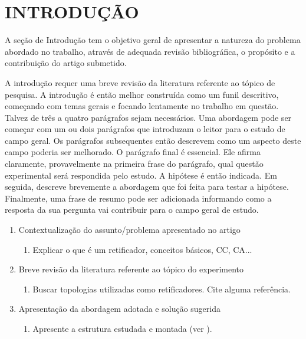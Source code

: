 %


\section{INTRODUÇÃO}


A seção de Introdução tem o objetivo geral de apresentar a natureza do problema abordado no trabalho, através de adequada revisão bibliográfica, o propósito e a contribuição do artigo submetido.

A introdução requer uma breve revisão da literatura referente ao tópico de pesquisa. A introdução é então melhor construída como um funil descritivo, começando com temas gerais e focando lentamente no trabalho em questão. Talvez de três a quatro parágrafos sejam necessários. Uma abordagem pode ser começar com um ou dois parágrafos que introduzam o leitor para o estudo de campo geral. Os parágrafos subsequentes então descrevem como um aspecto deste campo poderia ser melhorado. O parágrafo final é essencial. Ele afirma claramente, provavelmente na primeira frase do parágrafo, qual questão experimental será respondida pelo estudo. A hipótese é então indicada. Em seguida, descreve brevemente a abordagem que foi feita para testar a hipótese. Finalmente, uma frase de resumo pode ser adicionada informando como a resposta da sua pergunta vai contribuir para o campo geral de estudo.

\begin{enumerate}
\item Contextualização do assunto/problema apresentado no artigo
	\begin{enumerate}
		\item Explicar o que é um retificador, conceitos básicos, CC, CA...
	\end{enumerate}									
\item Breve revisão da literatura referente ao tópico do experimento
	\begin{enumerate}
		\item Buscar topologias utilizadas como retificadores. Cite alguma referência.
	\end{enumerate}	
\item Apresentação da abordagem adotada e solução sugerida
	\begin{enumerate}
		\item Apresente a estrutura estudada e montada (ver ).
	\end{enumerate}	
	\end{enumerate}	



